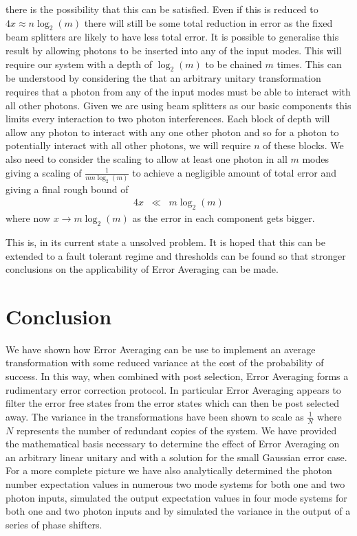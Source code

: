 \documentclass[aps,pra,twocolumn,superscriptaddress,numerical,floatfix]{revtex4-1}
\begin{document}
there is the possibility that this can be satisfied. Even if this is reduced to $4x\approx n\log_{2}\left(m\right)$ there will still be some total reduction in error as the fixed beam splitters are likely to have less total error. It is possible to generalise this result by allowing photons to be inserted into any of the input modes. This	will require our system with a depth of $\log_{2}\left(m\right)$ to be chained $m$  times. This can be understood by considering the that an arbitrary unitary transformation requires that a photon from any of the  input modes must be able to interact with all other photons. Given we are using beam splitters as our basic components this limits every interaction to two photon interferences. Each block of depth  will allow any photon to interact with any one other photon and so for a photon to potentially interact with all other photons, we will require $n$ of these blocks. We also need to consider the scaling to allow at least one photon in all $m$ modes giving a scaling of $\frac{1}{mn\log_{2}\left(m\right)}$ to achieve a negligible amount of total error and giving a final rough bound of
\begin{eqnarray}
4x & \ll & m\log_{2}\left(m\right)\label{eq:aDifferentInequality}
\end{eqnarray}
where now $x\rightarrow m\log_{2}\left(m\right)$ as the error in each component gets bigger.

This is, in its current state a unsolved problem. It is hoped that this can be extended to a fault tolerant regime and thresholds can be found so that stronger conclusions on the applicability of Error Averaging can be made.

\section{Conclusion\label{Conclusion}}
We have shown how Error Averaging can be use to implement an average transformation with some reduced variance at the cost of the probability of success. In this way, when combined with post selection, Error Averaging forms a rudimentary error correction protocol. In particular Error Averaging appears to filter the error free states from the error states which can then be post selected away. The variance in the transformations have been shown to scale as $\frac{1}{N}$ where $N$ represents the number of redundant copies of the system. We have provided the mathematical basis necessary to determine the effect of Error Averaging on an arbitrary linear unitary and with a solution for the small Gaussian error case. For a more complete picture we have also analytically determined the photon number expectation values in numerous two mode systems for both one and two photon inputs, simulated the output expectation values in four mode systems for both one and two photon inputs and by simulated the variance in the output of a series of phase shifters.
\end{document}

